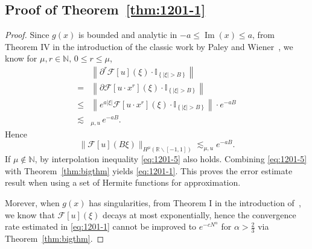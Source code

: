 \documentclass[pdflatex,sn-aps]{sn-jnl}%
\theoremstyle{thmstyleone}%
\theoremstyle{thmstyletwo}%
\theoremstyle{thmstylethree}%
\begin{document}
\begin{appendices}
\section{Proof of Theorem~\ref{thm:1201-1}}
\label{appendix:C}
\begin{proof}
  Since $g(x)$ is bounded and analytic in $-a \leqslant \operatorname{Im}(x) \leqslant a$, 
  from Theorem IV in the introduction of the classic work by Paley and Wiener~\cite{paley1934fourier},
  we know for $\mu,r \in \mathbb{N}, \,0 \leqslant r \leqslant \mu$,
  \begin{equation}\label{eq:1201-4}
    \begin{aligned}
    & \left\|\partial^r \mathcal{F}[u](\xi) \cdot \mathbb{I}_{\left\{|\xi|>B\right\}}\right\| \\
    = & \left\|\partial \mathcal{F}\left[u \cdot x^r\right](\xi) \cdot \mathbb{I}_{\left\{|\xi|>B\right\}}\right\| \\
    \leqslant & \left\|e^{a|\xi|} \mathcal{F}\left[u \cdot x^r\right](\xi) \cdot \mathbb{I}_{\left\{|\xi|>B\right\}}\right\| \cdot e^{-aB} \\
    \lesssim&_{\mu,u}\,e^{-aB}.
    \end{aligned}
  \end{equation}
  Hence
  \begin{equation}\label{eq:1201-5}
    \|\mathcal{F}[u](B \xi)\|_{H^\mu(\mathbb{R} \backslash[-1,1])} \lesssim_{\mu, u} e^{-a B}.
  \end{equation}
  If $\mu \notin \mathbb{N}$, by interpolation inequality \eqref{eq:1201-5} also holds.
  Combining \eqref{eq:1201-5} with Theorem~\ref{thm:bigthm} yields \eqref{eq:1201-1}. 
  This proves the error estimate result when using a set of Hermite functions for approximation.

  Morever, when $g(x)$ has singularities, from Theorem I in the introduction of~\cite{paley1934fourier},
  we know that $\mathcal{F}[u](\xi)$ decays at most exponentially, hence
  the convergence rate estimated in
  \eqref{eq:1201-1} cannot be improved to $e^{-cN^\alpha}$ for $\alpha > \frac{2}{3}$
  via Theorem~\ref{thm:bigthm}.


\end{proof}
\end{appendices}
\end{document}

